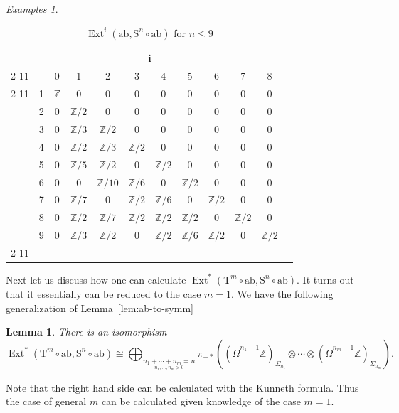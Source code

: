 \documentclass[psamsfonts]{amsart}
\theoremstyle{plain}
\newtheorem{lem}[thm]{Lemma}
\theoremstyle{definition}
\theoremstyle{remark}
\newtheorem{exmps}[thm]{Examples}
\newcommand{\Z}{\mathbb{Z}}
\newcommand{\abelianization}{\mathrm{ab}}
\newcommand{\tensor}{\mathrm{T}}
\newcommand{\symm}{\mathrm{S}}
\DeclareMathOperator{\ext}{Ext}
\begin{document}
\begin{exmps}
\begin{table}
    \centering
    \begin{tabular}{c|c||c|c|c|c|c|c|c|c|c|c|}
       \multicolumn{11}{c}{\, \, \quad i} \\
       \cline{2-11}
      \multirow{10}{*}{n}& & 0 & 1 & 2 & 3 & 4 & 5 & 6 & 7 & 8  \\ \cline{2-11} \cline{2-11}
      & 1  & $\Z$ & 0 & 0 & 0 & 0 & 0 & 0 & 0 & 0 \\
      & 2  & 0 & $\Z/2$ & 0 & 0 & 0 & 0 & 0 & 0 & 0 \\
       & 3 & 0 & $\Z/3$ & $\Z/2$ & 0 & 0 & 0 & 0 & 0 & 0 \\
       & 4 & 0 & $\Z/2$ & $\Z/3$ & $\Z/2$ & 0 & 0 & 0 & 0 & 0  \\
       & 5 & 0 & $\Z/5$ & $\Z/2$ & 0 & $\Z/2$ & 0 & 0 & 0 &0 \\
       &6  & 0 & 0 & $\Z/10$ & $\Z/6$ & 0 & $\Z/2$ & 0 & 0 & 0 \\
       & 7 & 0 & $\Z/7$ & 0 & $\Z/2$ & $\Z/6$ & 0 & $\Z/2$ & 0 & 0 \\
       & 8 & 0 & $\Z/2$ & $\Z/7$ & $\Z/2$ & $\Z/2$ & $\Z/2$ & 0 & $\Z/2$ & 0\\
& 9 & 0 & $\Z/3$ & $\Z/2$ & 0 & $\Z/2$ & $\Z/6$ & $\Z/2$ & 0 & $\Z/2$\\ \cline{2-11}
    \end{tabular}
    \caption{$\ext^i(\abelianization, \symm^n\circ\abelianization)$ for $n\le 9$}
    \label{tab:ext}
\end{table}
\end{exmps}
Next let us discuss how one can calculate $\ext^*(\tensor^m\circ \abelianization, \symm^n\circ \abelianization)$. It turns out that it essentially can be reduced to the case $m=1$. We have the following generalization of Lemma~\ref{lem:ab-to-symm}
\begin{lem}\label{lem:tensor-to-symm}
There is an isomorphism
\[
\ext^*\left(\tensor^m\circ \abelianization, \symm^n\circ\abelianization\right)\cong \bigoplus_{\underset{n_1, \ldots, n_m>0}{n_1+\cdots +n_m=n}}\pi_{-*}\left((\bar\Omega^{n_1-1} \Z)_{\Sigma_{n_1}}\otimes\cdots \otimes (\bar\Omega^{n_m-1} \Z)_{\Sigma_{n_m}}\right).
\]
\end{lem}
Note that the right hand side can be calculated with the Kunneth formula. Thus the case of general $m$ can be calculated given knowledge of the case $m=1$.
\end{document}
